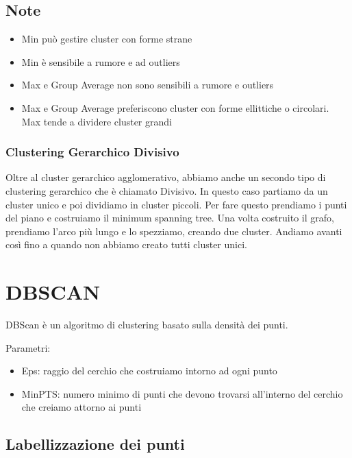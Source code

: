 \documentclass[14pt]{extreport}
\begin{document}
\section{Note}

\begin{itemize}
    \item Min può gestire cluster con forme strane
    \item Min è sensibile a rumore e ad outliers
    \item Max e Group Average non sono sensibili a rumore e outliers
    \item Max e Group Average preferiscono cluster con forme ellittiche o circolari. Max tende a dividere cluster grandi
    
\end{itemize}

\subsection{Clustering Gerarchico Divisivo}

Oltre al cluster gerarchico agglomerativo, abbiamo anche un secondo tipo di clustering gerarchico che è chiamato Divisivo.
In questo caso partiamo da un cluster unico e poi dividiamo in cluster piccoli.
Per fare questo prendiamo i punti del piano e costruiamo il minimum spanning tree. Una volta costruito il grafo, prendiamo l'arco più lungo e lo spezziamo, creando due cluster. Andiamo avanti così fino a quando non abbiamo creato tutti cluster unici.

\chapter{DBSCAN}

DBScan è un algoritmo di clustering basato sulla densità dei punti.

Parametri:

\begin{itemize}
    \item Eps: raggio del cerchio che costruiamo intorno ad ogni punto
    \item MinPTS: numero minimo di punti che devono trovarsi all'interno del cerchio che creiamo attorno ai punti 
\end{itemize}

\section{Labellizzazione dei punti}
\end{document}
